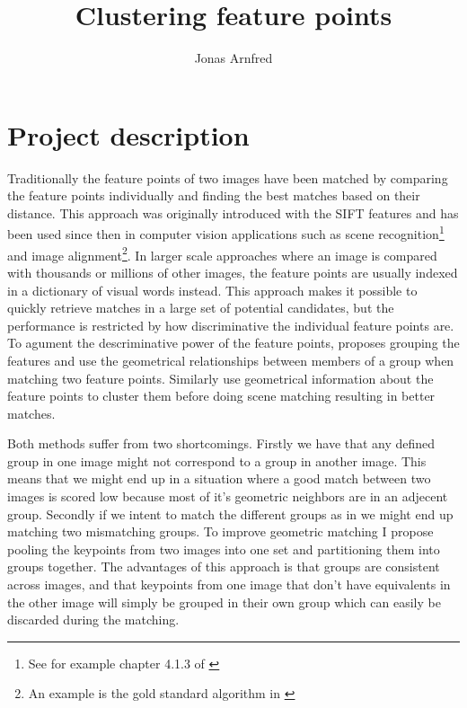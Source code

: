 \documentclass{article}
\begin{document}
\title{Clustering feature points}
\author{Jonas Arnfred}

\maketitle

\begin{abstract}
\end{abstract}

\section{Project description}

Traditionally the feature points of two images have been matched by 
comparing the feature points individually and finding the best matches 
based on their distance. This approach was originally introduced with 
the SIFT features \cite{lowe2004sift} and has been used since then in 
computer vision applications such as scene recognition\footnote{See for 
example chapter 4.1.3 of \cite[pp. 226]{szeliski2010}} and image 
alignment\footnote{An example is the gold standard algorithm in \cite[p.  
114]{multipleView}}. In larger scale approaches where an image is 
compared with thousands or millions of other images, the feature points 
are usually indexed in a dictionary of visual words instead. This 
approach makes it possible to quickly retrieve matches in a large set of 
potential candidates, but the performance is restricted by how 
discriminative the individual feature points are. To agument the 
descriminative power of the feature points, \cite{wu2009bundling} 
proposes grouping the features and use the geometrical relationships 
between members of a group when matching two feature points. Similarly 
\cite{das2008event} use geometrical information about the feature points 
to cluster them before doing scene matching resulting in better matches.

Both methods suffer from two shortcomings. Firstly we have that any 
defined group in one image might not correspond to a group in another 
image.  This means that we might end up in a situation where a good 
match between two images is scored low because most of it's geometric 
neighbors are in an adjecent group. Secondly if we intent to match the 
different groups as in \cite{wu2009bundling} we might end up matching 
two mismatching groups. To improve geometric matching I propose pooling 
the keypoints from two images into one set and partitioning them into 
groups together.  The advantages of this approach is that groups are 
consistent across images, and that keypoints from one image that don't 
have equivalents in the other image will simply be grouped in their own 
group which can easily be discarded during the matching.
\end{document}
